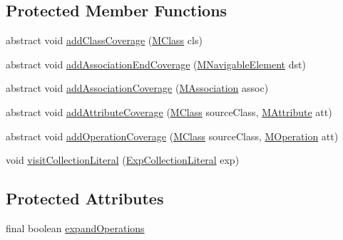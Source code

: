 \subsection*{Protected Member Functions}
\begin{DoxyCompactItemize}
\item 
abstract void \hyperlink{classorg_1_1tzi_1_1use_1_1analysis_1_1coverage_1_1_abstract_coverage_visitor_ac52ec04107ebdca03b3162fd26cb34f3}{add\-Class\-Coverage} (\hyperlink{interfaceorg_1_1tzi_1_1use_1_1uml_1_1mm_1_1_m_class}{M\-Class} cls)
\item 
abstract void \hyperlink{classorg_1_1tzi_1_1use_1_1analysis_1_1coverage_1_1_abstract_coverage_visitor_a55bc904afc16f2052e712c68363b9a58}{add\-Association\-End\-Coverage} (\hyperlink{interfaceorg_1_1tzi_1_1use_1_1uml_1_1mm_1_1_m_navigable_element}{M\-Navigable\-Element} dst)
\item 
abstract void \hyperlink{classorg_1_1tzi_1_1use_1_1analysis_1_1coverage_1_1_abstract_coverage_visitor_a592ec9fcc7041e1a631b2e010f1d4f7c}{add\-Association\-Coverage} (\hyperlink{interfaceorg_1_1tzi_1_1use_1_1uml_1_1mm_1_1_m_association}{M\-Association} assoc)
\item 
abstract void \hyperlink{classorg_1_1tzi_1_1use_1_1analysis_1_1coverage_1_1_abstract_coverage_visitor_a829d791884c47a4cd43ac2cbf96e0796}{add\-Attribute\-Coverage} (\hyperlink{interfaceorg_1_1tzi_1_1use_1_1uml_1_1mm_1_1_m_class}{M\-Class} source\-Class, \hyperlink{classorg_1_1tzi_1_1use_1_1uml_1_1mm_1_1_m_attribute}{M\-Attribute} att)
\item 
abstract void \hyperlink{classorg_1_1tzi_1_1use_1_1analysis_1_1coverage_1_1_abstract_coverage_visitor_a5304fa772935cd8ba4f9b7adbba55a4a}{add\-Operation\-Coverage} (\hyperlink{interfaceorg_1_1tzi_1_1use_1_1uml_1_1mm_1_1_m_class}{M\-Class} source\-Class, \hyperlink{classorg_1_1tzi_1_1use_1_1uml_1_1mm_1_1_m_operation}{M\-Operation} att)
\item 
void \hyperlink{classorg_1_1tzi_1_1use_1_1analysis_1_1coverage_1_1_abstract_coverage_visitor_ab4b3c78f1c5f87c52f3d610815a42592}{visit\-Collection\-Literal} (\hyperlink{classorg_1_1tzi_1_1use_1_1uml_1_1ocl_1_1expr_1_1_exp_collection_literal}{Exp\-Collection\-Literal} exp)
\end{DoxyCompactItemize}
\subsection*{Protected Attributes}
\begin{DoxyCompactItemize}
\item 
final boolean \hyperlink{classorg_1_1tzi_1_1use_1_1analysis_1_1coverage_1_1_abstract_coverage_visitor_a2686463cc149dcb3cfc8c1efb80a69c2}{expand\-Operations}
\end{DoxyCompactItemize}


